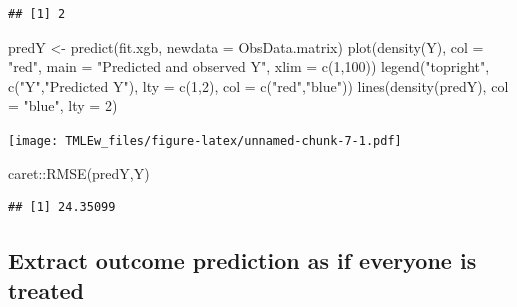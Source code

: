 \documentclass[
]{book}
\newenvironment{Shaded}{\begin{snugshade}}{\end{snugshade}}
\newcommand{\AttributeTok}[1]{\textcolor[rgb]{0.77,0.63,0.00}{#1}}
\newcommand{\DecValTok}[1]{\textcolor[rgb]{0.00,0.00,0.81}{#1}}
\newcommand{\FunctionTok}[1]{\textcolor[rgb]{0.00,0.00,0.00}{#1}}
\newcommand{\NormalTok}[1]{#1}
\newcommand{\OtherTok}[1]{\textcolor[rgb]{0.56,0.35,0.01}{#1}}
\newcommand{\SpecialCharTok}[1]{\textcolor[rgb]{0.00,0.00,0.00}{#1}}
\newcommand{\StringTok}[1]{\textcolor[rgb]{0.31,0.60,0.02}{#1}}
\begin{document}
\begin{verbatim}
## [1] 2
\end{verbatim}

\begin{Shaded}
\begin{Highlighting}[]
\NormalTok{predY }\OtherTok{\textless{}{-}} \FunctionTok{predict}\NormalTok{(fit.xgb, }\AttributeTok{newdata =}\NormalTok{ ObsData.matrix)}
\FunctionTok{plot}\NormalTok{(}\FunctionTok{density}\NormalTok{(Y), }
     \AttributeTok{col =} \StringTok{"red"}\NormalTok{, }
     \AttributeTok{main =} \StringTok{"Predicted and observed Y"}\NormalTok{,}
     \AttributeTok{xlim =} \FunctionTok{c}\NormalTok{(}\DecValTok{1}\NormalTok{,}\DecValTok{100}\NormalTok{))  }
\FunctionTok{legend}\NormalTok{(}\StringTok{"topright"}\NormalTok{, }
       \FunctionTok{c}\NormalTok{(}\StringTok{"Y"}\NormalTok{,}\StringTok{"Predicted Y"}\NormalTok{), }
       \AttributeTok{lty =} \FunctionTok{c}\NormalTok{(}\DecValTok{1}\NormalTok{,}\DecValTok{2}\NormalTok{), }
       \AttributeTok{col =} \FunctionTok{c}\NormalTok{(}\StringTok{"red"}\NormalTok{,}\StringTok{"blue"}\NormalTok{))}
\FunctionTok{lines}\NormalTok{(}\FunctionTok{density}\NormalTok{(predY), }\AttributeTok{col =} \StringTok{"blue"}\NormalTok{, }\AttributeTok{lty =} \DecValTok{2}\NormalTok{)}
\end{Highlighting}
\end{Shaded}

\texttt{[image: TMLEw\_files/figure-latex/unnamed-chunk-7-1.pdf]}

\begin{Shaded}
\begin{Highlighting}[]
\NormalTok{caret}\SpecialCharTok{::}\FunctionTok{RMSE}\NormalTok{(predY,Y)}
\end{Highlighting}
\end{Shaded}

\begin{verbatim}
## [1] 24.35099
\end{verbatim}

\hypertarget{extract-outcome-prediction-as-if-everyone-is-treated}{%
\subsection{Extract outcome prediction as if everyone is treated}\label{extract-outcome-prediction-as-if-everyone-is-treated}}

\begin{Shaded}
\end{Shaded}
\end{document}
